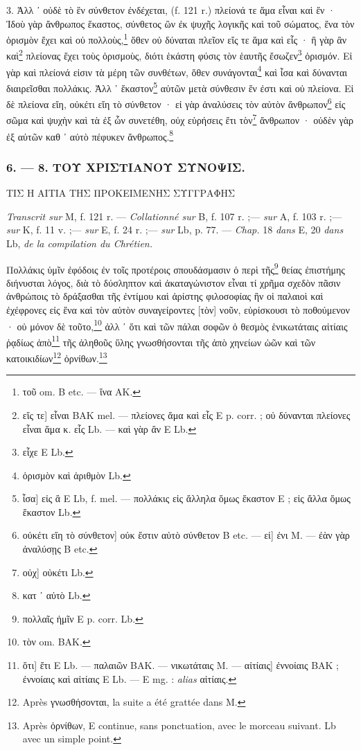 \documentclass[a4paper, 11pt, oneside, polutonikogreek, french]{article}
\begin{document}
3. Ἀλλ ᾽ οὐδὲ τὸ ἓν σύνθετον ἐνδέχεται, (f. 121 r.) πλείονά τε ἅμα εἶναι καὶ ἕν · Ἰδοὺ γὰρ ἄνθρωπος ἕκαστος, σύνθετος ὢν ἐκ ψυχῆς λογικῆς καὶ τοῦ σώματος, ἕνα τὸν ὁρισμὸν ἔχει καὶ οὐ πολλοὺς,\footnote{τοῦ om. B etc. --- ἵνα AK.} ὅθεν οὐ δύναται πλεῖον εἴς τε ἅμα καὶ εἷς · ἢ γὰρ ἂν καὶ\footnote{εἴς τε] εἶναι BAK mel. --- πλείονες ἅμα καὶ εἷς E p. corr. ; οὐ δύνανται πλείονες εἶναι ἅμα κ. εἷς Lb. --- καὶ γὰρ ἂν E Lb.} πλείονας ἔχει τοὺς ὁρισμοὺς, διότι ἑκάστη φύσις τὸν ἑαυτῆς ἔσωζεν\footnote{εἶχε E Lb.} ὁρισμόν. Εἰ γὰρ καὶ πλείονά εἰσιν τὰ μέρη τῶν συνθέτων, ὅθεν συνάγονται\footnote{ὁρισμὸν καὶ ἀριθμὸν Lb.} καὶ ἶσα καὶ δύνανται διαιρεῖσθαι πολλάκις. Ἀλλ ᾽ ἕκαστον\footnote{ἶσα] εἰς ἃ E Lb, f. mel. --- πολλάκις εἰς ἄλληλα ὅμως ἕκαστον E ; εἰς ἄλλα ὅμως ἕκαστον Lb.} αὐτῶν μετὰ σύνθεσιν ἕν ἐστι καὶ οὐ πλείονα. Εἰ δὲ πλείονα εἴη, οὐκέτι εἴη τὸ σύνθετον · εἰ γὰρ ἀναλύσεις τὸν αὐτὸν ἄνθρωπον\footnote{οὐκέτι εἴη τὸ σύνθετον] οὐκ ἔστιν αὐτὸ σύνθετον B etc. --- εἰ] ἐνι M. --- ἐὰν γὰρ ἀναλύσῃς B etc.} εἰς σῶμα καὶ ψυχὴν καὶ τὰ ἐξ ὧν συνετέθη, οὐχ εὑρήσεις ἔτι τὸν\footnote{οὐχ] οὐκέτι Lb.} ἄνθρωπον · οὐδὲν γὰρ ἐξ αὐτῶν καθ ᾽ αὐτὸ πέφυκεν ἄνθρωπος.\footnote{κατ ᾽ αὐτὸ Lb.}

\bigskip
\centerline{\EightStarTaper}
\centerline{\EightStarTaper\EightStarTaper}
\bigskip

\subsubsection{6. --- 8. ΤΟΥ ΧΡΙΣΤΙΑΝΟΥ ΣΥΝΟΨΙΣ.}

ΤΙΣ Η ΑΙΤΙΑ ΤΗΣ ΠΡΟΚΕΙΜΕΝΗΣ ΣΥΓΓΡΑΦΗΣ

\emph{Transcrit sur} M, f. 121 r. --- \emph{Collationné sur} B, f. 107 r. ;--- \emph{sur} A, f. 103 r. ;--- \emph{sur} K, f. 11 v. ;--- \emph{sur} E, f. 24 r. ;--- \emph{sur} Lb, p. 77. --- \emph{Chap.} 18 \emph{dans} E, 20 \emph{dans} Lb, \emph{de la compilation du Chrétien.}

Πολλάκις ὑμῖν ἐφόδοις ἐν τοῖς προτέροις σπουδάσμασιν ὁ περὶ τῆς\footnote{πολλαῖς ἡμῖν E p. corr. Lb.} θείας ἐπιστήμης διήνυσται λόγος, διὰ τὸ δύσληπτον καὶ ἀκαταγώνιστον εἶναι τί χρῆμα σχεδὸν πᾶσιν ἀνθρώποις τὸ δράξασθαι τῆς ἐντίμου καὶ ἀρίστης φιλοσοφίας ἢν οἱ παλαιοὶ καὶ ἐχέφρονες εἰς ἕνα καὶ τὸν αὐτὸν συναγείροντες [τὸν] νοῦν, εὑρίσκουσι τὸ ποθούμενον · οὐ μόνον δὲ τοῦτο,\footnote{τὸν om. BAK.} ἀλλ ᾽ ὅτι καὶ τῶν πάλαι σοφῶν ὁ θεσμὸς ἑνικωτάταις αἰτίαις ῥᾳδίως ἀπὸ\footnote{ὅτι] ἔτι E Lb. --- παλαιῶν BAK. --- νικωτάταις M. --- αἰτίαις] ἐννοίαις BAK ; ἐννοίαις καὶ αἰτίαις E Lb. --- E mg. : \emph{alias} αἰτίαις.} τῆς ἀληθοῦς ὕλης γνωσθήσονται τῆς ἀπὸ χηνείων ὠῶν καὶ τῶν κατοικιδίων\footnote{Après γνωσθήσονται, la suite a été grattée dans M.} ὀρνίθων.\footnote{Après ὀρνίθων, E continue, sans ponctuation, avec le morceau suivant. Lb avec un simple point.}
\end{document}
